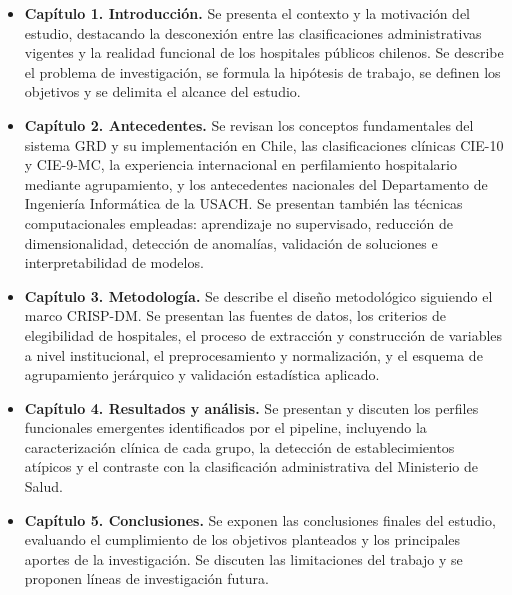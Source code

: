 \begin{itemize}

  \item \textbf{Capítulo 1. Introducción.}
        Se presenta el contexto y la motivación del estudio, destacando la
        desconexión entre las clasificaciones administrativas vigentes y la
        realidad funcional de los hospitales públicos chilenos. Se describe el
        problema de investigación, se formula la hipótesis de trabajo, se
        definen los objetivos y se delimita el alcance del estudio.

  \item \textbf{Capítulo 2. Antecedentes.}
        Se revisan los conceptos fundamentales del sistema GRD y su implementación
        en Chile, las clasificaciones clínicas CIE-10 y CIE-9-MC, la experiencia
        internacional en perfilamiento hospitalario mediante agrupamiento, y los
        antecedentes nacionales del Departamento de Ingeniería Informática de la
        USACH. Se presentan también las técnicas computacionales empleadas:
        aprendizaje no supervisado, reducción de dimensionalidad, detección de
        anomalías, validación de soluciones e interpretabilidad de modelos.

  \item \textbf{Capítulo 3. Metodología.}
        Se describe el diseño metodológico siguiendo el marco CRISP-DM. Se
        presentan las fuentes de datos, los criterios de elegibilidad de
        hospitales, el proceso de extracción y construcción de variables a nivel
        institucional, el preprocesamiento y normalización, y el esquema de
        agrupamiento jerárquico y validación estadística aplicado.

  \item \textbf{Capítulo 4. Resultados y análisis.}
        Se presentan y discuten los perfiles funcionales emergentes identificados
        por el pipeline, incluyendo la caracterización clínica de cada grupo, la
        detección de establecimientos atípicos y el contraste con la clasificación
        administrativa del Ministerio de Salud.

  \item \textbf{Capítulo 5. Conclusiones.}
        Se exponen las conclusiones finales del estudio, evaluando el cumplimiento
        de los objetivos planteados y los principales aportes de la investigación.
        Se discuten las limitaciones del trabajo y se proponen líneas de
        investigación futura.

\end{itemize}
